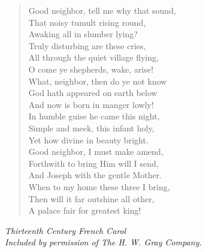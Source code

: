 
\begin{verse}
Good neighbor, tell me why that sound,\\
That noisy tumult rising round,\\
Awaking all in slumber lying?\\
Truly disturbing are these cries,\\
All through the quiet village flying,\\
O come ye shepherds, wake, arise!\\[0.7em]

What, neighbor, then do ye not know\\
God hath appeared on earth below\\
And now is born in manger lowly!\\
In humble guise he came this night,\\
Simple and meek, this infant holy,\\
Yet how divine in beauty bright.\\[0.7em]

Good neighbor, I must make amend,\\
Forthwith to bring Him will I send,\\
And Joseph with the gentle Mother.\\
When to my home these three I bring,\\
Then will it far outshine all other,\\
A palace fair for greatest king!%
\end{verse}

\vspace{0.5\baselineskip}
\noindent\textit{Thirteenth Century French Carol}\\
\noindent\textit{Included by permission of The H. W. Gray Company.}

\newpage

